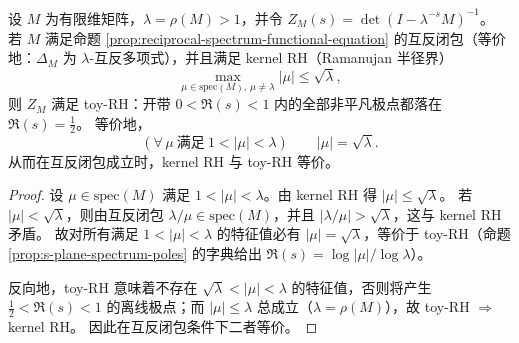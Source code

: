 \begin{proposition}[互反闭包 \texorpdfstring{$+$}{+} kernel RH \texorpdfstring{$\Rightarrow$}{=>} toy-RH]\label{prop:reciprocal-plus-kernel-rh-implies-toy-rh}
设 \(M\) 为有限维矩阵，\(\lambda=\rho(M)>1\)，并令
\(
Z_M(s)=\det(I-\lambda^{-s}M)^{-1}
\)。
若 \(M\) 满足命题 \ref{prop:reciprocal-spectrum-functional-equation} 的互反闭包（等价地：\(\Delta_M\) 为 \(\lambda\)-互反多项式），并且满足 kernel RH（Ramanujan 半径界）
\[
\max_{\mu\in\mathrm{spec}(M),\,\mu\neq \lambda}|\mu|\le \sqrt{\lambda},
\]
则 \(Z_M\) 满足 toy-RH：开带 \(0<\Re(s)<1\) 内的全部非平凡极点都落在 \(\Re(s)=\tfrac12\)。
等价地，
\[
(\forall\,\mu\ \text{满足}\ 1<|\mu|<\lambda)\qquad |\mu|=\sqrt{\lambda}.
\]
从而在互反闭包成立时，kernel RH 与 toy-RH 等价。
\end{proposition}
\begin{proof}
设 \(\mu\in\mathrm{spec}(M)\) 满足 \(1<|\mu|<\lambda\)。由 kernel RH 得 \(|\mu|\le \sqrt{\lambda}\)。
若 \(|\mu|<\sqrt{\lambda}\)，则由互反闭包 \(\lambda/\mu\in\mathrm{spec}(M)\)，并且
\(
|\lambda/\mu|>\sqrt{\lambda}
\)，这与 kernel RH 矛盾。
故对所有满足 \(1<|\mu|<\lambda\) 的特征值必有 \(|\mu|=\sqrt{\lambda}\)，等价于 toy-RH（命题 \ref{prop:s-plane-spectrum-poles} 的字典给出 \(\Re(s)=\log|\mu|/\log\lambda\)）。
\par
反向地，toy-RH 意味着不存在 \(\sqrt{\lambda}<|\mu|<\lambda\) 的特征值，否则将产生 \(\tfrac12<\Re(s)<1\) 的离线极点；而 \(|\mu|\le \lambda\) 总成立（\(\lambda=\rho(M)\)），故 toy-RH \(\Rightarrow\) kernel RH。
因此在互反闭包条件下二者等价。
\end{proof}

